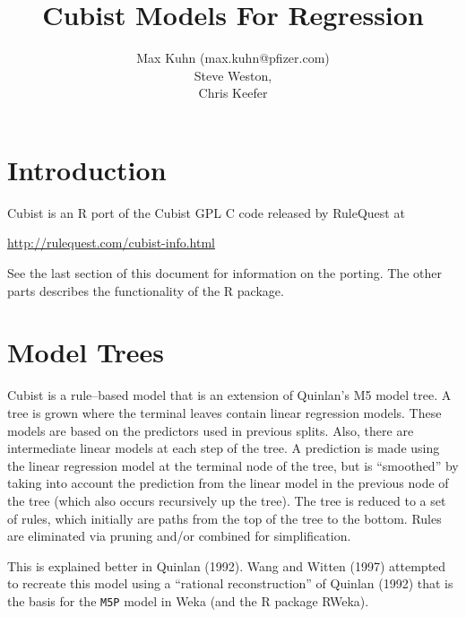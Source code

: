 \documentclass[12pt]{article}
\title{Cubist Models For Regression}
\author{Max Kuhn (max.kuhn@pfizer.com) \\ Steve Weston, \\ Chris Keefer}
\newcommand{\code}[1]{\mbox{\footnotesize\color{darkblue}\texttt{#1}}}
\newcommand{\pkg}[1]{{\fontseries{b}\selectfont #1}}
\renewcommand{\pkg}[1]{{\textsf{#1}}}
\begin{document}
\maketitle

\thispagestyle{empty}
	
\section{Introduction}

\pkg{Cubist} is an \pkg{R} port of the Cubist GPL \pkg{C} code released by RuleQuest at
\begin{center}
\href{http://rulequest.com/cubist-info.html}{http://rulequest.com/cubist-info.html}  
\end{center}
See the last section of this document for information on the porting. The other parts describes the functionality of the \pkg{R} package.


\section{Model Trees}

Cubist is a rule--based model that is an extension of Quinlan's M5 model tree. A tree is grown where the terminal leaves contain linear regression models. These models are based on the predictors used in previous splits.  Also, there are intermediate linear models at each step of the tree. A prediction is made using the linear regression model at the terminal node of the tree, but is ``smoothed'' by taking into account the prediction from the linear model in the previous node of the tree (which also occurs recursively up the tree). The tree is reduced to a set of rules, which initially are paths from the top of the tree to the bottom. Rules are eliminated via pruning and/or combined for simplification. 

This is explained better in Quinlan (1992). Wang and Witten (1997) attempted to recreate this model using a ``rational reconstruction'' of Quinlan (1992) that is the basis for the \code{M5P} model in \pkg{Weka} (and the R package \pkg{RWeka}).
\end{document}
